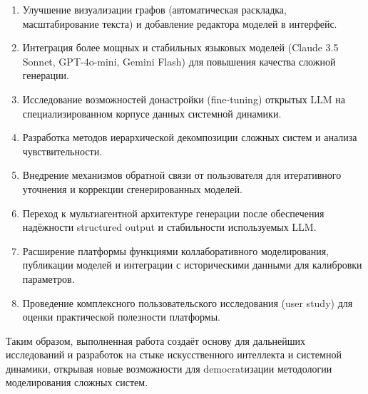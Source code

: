 \begin{enumerate}
    \item Улучшение визуализации графов (автоматическая раскладка, масштабирование текста) и добавление редактора моделей в интерфейс.

    \item Интеграция более мощных и стабильных языковых моделей (Claude 3.5 Sonnet, GPT-4o-mini, Gemini Flash) для повышения качества сложной генерации.

    \item Исследование возможностей донастройки (fine-tuning) открытых LLM на специализированном корпусе данных системной динамики.

    \item Разработка методов иерархической декомпозиции сложных систем и анализа чувствительности.

    \item Внедрение механизмов обратной связи от пользователя для итеративного уточнения и коррекции сгенерированных моделей.

    \item Переход к мультиагентной архитектуре генерации после обеспечения надёжности structured output и стабильности используемых LLM.

    \item Расширение платформы функциями коллаборативного моделирования, публикации моделей и интеграции с историческими данными для калибровки параметров.

    \item Проведение комплексного пользовательского исследования (user study) для оценки практической полезности платформы.
\end{enumerate}

Таким образом, выполненная работа создаёт основу для дальнейших исследований и разработок на стыке искусственного интеллекта и системной динамики, открывая новые возможности для democratизации методологии моделирования сложных систем.
